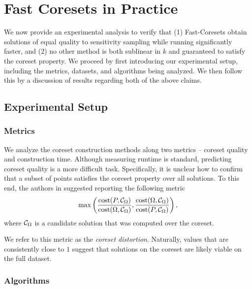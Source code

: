 \section{Fast Coresets in Practice}

We now provide an experimental analysis to verify that (1) Fast-Coresets obtain solutions of equal quality to sensitivity sampling while running significantly
faster, and (2) no other method is both sublinear in $k$ and guaranteed to satisfy the coreset property. We proceed by first
introducing our experimental setup, including the metrics, datasets, and algorithms being analyzed. We then follow this by a discussion of results regarding
both of the above claims.

\subsection{Experimental Setup}
\subsubsection{Metrics}

We analyze the coreset construction methods along two metrics -- coreset quality and construction time.  Although measuring runtime is standard, predicting coreset
quality is a more difficult task. Specifically, it is unclear how to confirm that a subset of points satisfies the coreset property over all solutions. To this
end, the authors in \cite{chrisESA} suggested reporting the following metric 
\[ \max \left( \dfrac{\operatorname{cost}(P, \mathcal C_{\Omega})}{\operatorname{cost}(\Omega, \mathcal C_{\Omega})}, \dfrac{\operatorname{cost}(\Omega, \mathcal C_{\Omega})}{\operatorname{cost}(P, \mathcal C_{\Omega})} \right),\]
where $\mathcal C_{\Omega}$ is a candidate solution that was computed over the coreset.

We refer to this metric as the \emph{coreset distortion}. Naturally, values that are consistently close to $1$ suggest that solutions on the coreset are likely
viable on the full dataset.


\subsubsection{Algorithms}
\label{ssec:algorithms}


